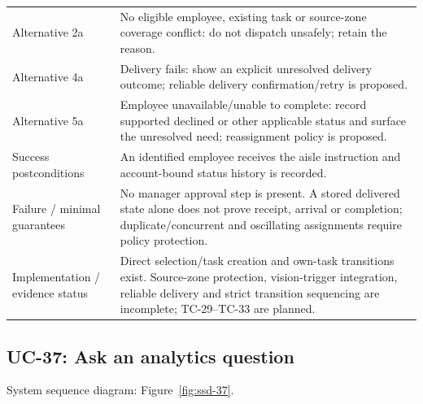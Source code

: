 \begin{longtable}{P{0.23\textwidth}P{0.67\textwidth}}
Alternative 2a & No eligible employee, existing task or source-zone coverage conflict: do not dispatch unsafely; retain the reason.\\
Alternative 4a & Delivery fails: show an explicit unresolved delivery outcome; reliable delivery confirmation/retry is proposed.\\
Alternative 5a & Employee unavailable/unable to complete: record supported declined or other applicable status and surface the unresolved need; reassignment policy is proposed.\\
Success postconditions & An identified employee receives the aisle instruction and account-bound status history is recorded.\\
Failure / minimal guarantees & No manager approval step is present. A stored delivered state alone does not prove receipt, arrival or completion; duplicate/concurrent and oscillating assignments require policy protection.\\
Implementation / evidence status & Direct selection/task creation and own-task transitions exist. Source-zone protection, vision-trigger integration, reliable delivery and strict transition sequencing are incomplete; TC-29--TC-33 are planned.\\
\bottomrule
\end{longtable}

\subsection*{UC-37: Ask an analytics question}
\label{uc:37}
System sequence diagram: Figure~\ref{fig:ssd-37}.

